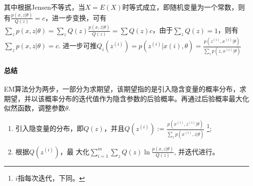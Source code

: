 \documentclass[12pt,a4paper]{article}
\begin{document}
  其中根据Jensen不等式，当$X=E(X)$时等式成立，即随机变量为一个常数，则有$\frac{p(x,z|\theta)}{Q(z)}=c$，进一步变换，可有$\sum\limits_z p(x,z|\theta) = \sum\limits_z Q(z) \frac{p(x,z|\theta)}{Q(z)}=\sum Q(z)c$，由于$\sum\limits _z Q(z)=1$，则有$\sum\limits_z p(x,z|\theta) = c$. 进一步可推$Q_i(z^{(i)})=p(z^{(i)}|x(i),\theta) = \frac{p(z^{(i)}, x^{(i)}|\theta)}{\sum\limits_z p(z, x^{(i)}|\theta)}$
  

  \paragraph{总结} EM算法分为两步，一部分为求期望，该期望指的是引入隐含变量的概率分布，求期望，并以该概率分布的迭代值作为隐含参数的后验概率。再通过后验概率最大化似然函数，调整参数$\theta$.
  \begin{enumerate}
    \item 引入隐变量的分布，即$Q(z)$，并且$Q(z^{(i)}) := \frac{p(x^{(i)}, z^{(i)} | \theta)}{\sum\limits_z p(x^{(i)}, z | \theta)}$ \footnote{$i$指每次迭代，下同。};
    \item 根据$Q(z^{(i)})$，最 大化$\sum\limits _{i=1} ^m \sum\limits _z Q(z) \ln \frac{p(x,z|\theta)}{Q(z)}$, 并迭代进行。
  \end{enumerate}

  
  
\end{document}
